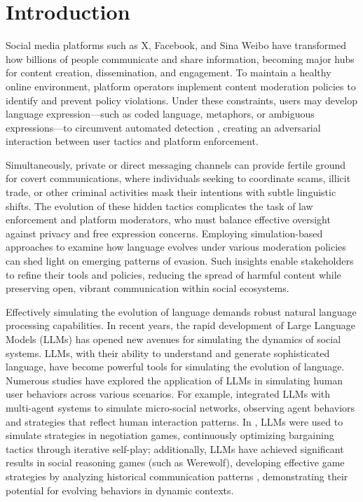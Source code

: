 \section{Introduction} %
Social media platforms such as X, Facebook, and Sina Weibo have transformed how billions of people communicate and share information, becoming major hubs for content creation, dissemination, and engagement. To maintain a healthy online environment, platform operators implement content moderation policies to identify and prevent policy violations. Under these constraints, users may develop language expression—such as coded language, metaphors, or ambiguous expressions—to circumvent automated detection \cite{hunt2025digital}, creating an adversarial interaction between user tactics and platform enforcement.

Simultaneously, private or direct messaging channels can provide fertile ground for covert communications, where individuals seeking to coordinate scams, illicit trade, or other criminal activities mask their intentions with subtle linguistic shifts. The evolution of these hidden tactics complicates the task of law enforcement and platform moderators, who must balance effective oversight against privacy and free expression concerns. Employing simulation-based approaches to examine how language evolves under various moderation policies can shed light on emerging patterns of evasion. Such insights enable stakeholders to refine their tools and policies, reducing the spread of harmful content while preserving open, vibrant communication within social ecosystems.

Effectively simulating the evolution of language demands robust natural language processing capabilities. In recent years, the rapid development of Large Language Models (LLMs) has opened new avenues for simulating the dynamics of social systems.
LLMs, with their ability to understand and generate sophisticated language, have become powerful tools for simulating the evolution of language. Numerous studies have explored the application of LLMs in simulating human user behaviors across various scenarios. For example, \cite{hua2023war, park2023generative, gao2023s3} integrated LLMs with multi-agent systems to simulate micro-social networks, observing agent behaviors and strategies that reflect human interaction patterns. In \cite{fu2023improving}, LLMs were used to simulate strategies in negotiation games, continuously optimizing bargaining tactics through iterative self-play; additionally, LLMs have achieved significant results in social reasoning games (such as Werewolf), developing effective game strategies by analyzing historical communication patterns \cite{xu2023exploring}, demonstrating their potential for evolving behaviors in dynamic contexts.

